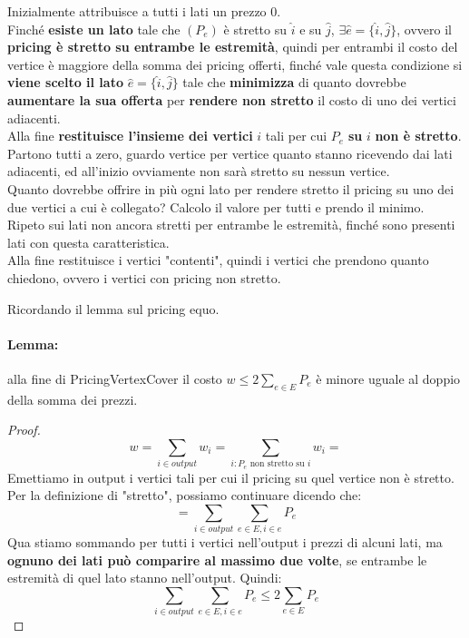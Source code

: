 Inizialmente attribuisce a tutti i lati un prezzo 0.\\

Finché \textbf{esiste un lato} tale che $(P_e)$ è stretto su $\hat{i}$ e su $\hat{j}$, $\exists \hat{e} = \{\hat{i}, \hat{j}\}$, ovvero il \textbf{pricing è stretto su entrambe le estremità}, quindi per entrambi il costo del vertice è maggiore della somma dei pricing offerti, finché vale questa condizione si \textbf{viene scelto il lato} $\hat{e} = \{\hat{i}, \hat{j}\}$ tale che \textbf{minimizza} di quanto dovrebbe \textbf{aumentare la sua offerta} per \textbf{rendere non stretto} il costo di uno dei vertici adiacenti.\\

Alla fine \textbf{restituisce l'insieme dei vertici} $i$ tali per cui $P_e$ \textbf{su} $i$ \textbf{non è stretto}.\\

Partono tutti a zero, guardo vertice per vertice quanto stanno ricevendo dai lati adiacenti, ed all'inizio ovviamente non sarà stretto su nessun vertice.\\
Quanto dovrebbe offrire in più ogni lato per rendere stretto il pricing su uno dei due vertici a cui è collegato? Calcolo il valore per tutti e prendo il minimo.\\
Ripeto sui lati non ancora stretti per entrambe le estremità, finché sono presenti lati con questa caratteristica.\\

Alla fine restituisce i vertici "contenti", quindi i vertici che prendono quanto chiedono, ovvero i vertici con pricing non stretto.


\newpage

Ricordando il lemma sul pricing equo.

\paragraph{Lemma:} alla fine di PricingVertexCover il costo $w \leq 2 \sum_{e \in E} P_e$ è minore uguale al doppio della somma dei prezzi. \\

\begin{proof}
	$$ w = \sum_{i \in output} w_i = \sum_{i: P_e \text{ non stretto su } i} w_i = $$
	Emettiamo in output i vertici tali per cui il pricing su quel vertice non è stretto. Per la definizione di "stretto", possiamo continuare dicendo che: 
	$$ = \sum_{i \in output} \sum_{e \in E, i \in e} P_e$$
	Qua stiamo sommando per tutti i vertici nell'output i prezzi di alcuni lati, ma \textbf{ognuno dei lati può comparire al massimo due volte}, se entrambe le estremità di quel lato stanno nell'output. Quindi:
	$$ \sum_{i \in output} \sum_{e \in E, i \in e} P_e \leq 2 \sum_{e \in E} P_e$$
\end{proof}

